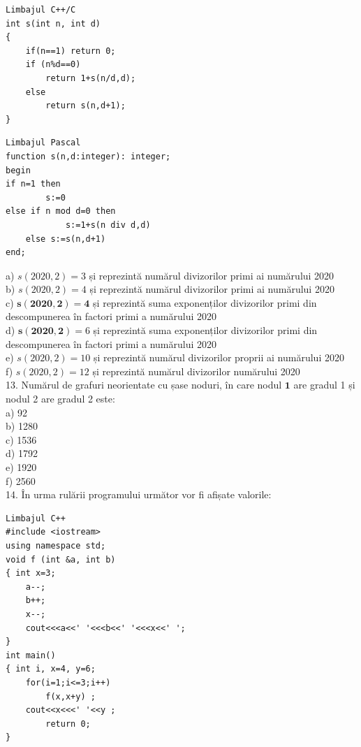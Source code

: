 \documentclass[10pt]{article}
\begin{document}
\begin{verbatim}
Limbajul C++/C
int s(int n, int d)
{
    if(n==1) return 0;
    if (n%d==0)
        return 1+s(n/d,d);
    else
        return s(n,d+1);
}
\end{verbatim}

\begin{verbatim}
Limbajul Pascal
function s(n,d:integer): integer;
begin
if n=1 then
        s:=0
else if n mod d=0 then
            s:=1+s(n div d,d)
    else s:=s(n,d+1)
end;
\end{verbatim}

a) $s(2020,2)=3$ și reprezintă numărul divizorilor primi ai numărului 2020\\
b) $s(2020,2)=4$ și reprezintă numărul divizorilor primi ai numărului 2020\\
c) $\mathbf{s}(\mathbf{2 0 2 0}, \mathbf{2})=\mathbf{4}$ și reprezintă suma exponenților divizorilor primi din descompunerea în factori primi a numărului 2020\\
d) $\mathbf{s}(\mathbf{2 0 2 0}, \mathbf{2})=6$ și reprezintă suma exponenților divizorilor primi din descompunerea în factori primi a numărului 2020\\
e) $s(2020,2)=10$ și reprezintă numărul divizorilor proprii ai numărului 2020\\
f) $s(2020,2)=12$ și reprezintă numărul divizorilor numărului 2020\\
13. Numărul de grafuri neorientate cu șase noduri, în care nodul $\mathbf{1}$ are gradul 1 și nodul 2 are gradul 2 este:\\
a) 92\\
b) 1280\\
c) 1536\\
d) 1792\\
e) 1920\\
f) 2560\\
14. În urma rulării programului următor vor fi afișate valorile:

\begin{verbatim}
Limbajul C++
#include <iostream>
using namespace std;
void f (int &a, int b)
{ int x=3;
    a--;
    b++;
    x--;
    cout<<<a<<' '<<<b<<' '<<<x<<' ';
}
int main()
{ int i, x=4, y=6;
    for(i=1;i<=3;i++)
        f(x,x+y) ;
    cout<<x<<<' '<<y ;
        return 0;
}
\end{verbatim}
\end{document}
